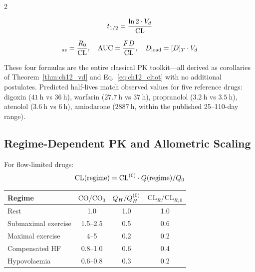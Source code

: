 \begin{multicols}{2}
\begin{corollary}
\begin{equation}
t_{1/2} = \frac{\ln 2\cdot V_d}{\mathrm{CL}}
\label{eq:ch12_thalf}
\end{equation}
\end{corollary}

\begin{corollary}
\begin{equation}
[D]_{ss} = \frac{R_0}{\CLtot}, \quad \mathrm{AUC} = \frac{FD}{\CLtot}, \quad D_{\mathrm{load}} = [D]_T\cdot\Vd
\label{eq:ch12_ss}
\end{equation}
\end{corollary}

These four formulas are the entire classical PK toolkit---all derived as corollaries of Theorem~\ref{thm:ch12_vd} and Eq.~\ref{eq:ch12_cltot} with no additional postulates. Predicted half-lives match observed values for five reference drugs: digoxin ($41\ \mathrm{h}$ vs $36\ \mathrm{h}$), warfarin ($27.7\ \mathrm{h}$ vs $37\ \mathrm{h}$), propranolol ($3.2\ \mathrm{h}$ vs $3.5\ \mathrm{h}$), atenolol ($3.6\ \mathrm{h}$ vs $6\ \mathrm{h}$), amiodarone ($2887\ \mathrm{h}$, within the published 25--110-day range).

\subsection{Regime-Dependent PK and Allometric Scaling}

\begin{theorem}
For flow-limited drugs:
\begin{equation}
\mathrm{CL}(\mathrm{regime}) = \mathrm{CL}^{(0)}\cdot Q(\mathrm{regime})/Q_0
\label{eq:ch12_regime_cl}
\end{equation}
\end{theorem}

\begin{center}
\begin{tabular}{lccc}
\toprule
Regime & $\mathrm{CO}/\mathrm{CO}_0$ & $Q_H/Q_H^{(0)}$ & $\mathrm{CL}_R/\mathrm{CL}_{R,0}$ \\
\midrule
Rest                & 1.0 & 1.0 & 1.0 \\
Submaximal exercise & 1.5--2.5 & 0.5 & 0.6 \\
Maximal exercise    & 4--5     & 0.2 & 0.2 \\
Compensated HF      & 0.8--1.0 & 0.6 & 0.4 \\
Hypovolaemia        & 0.6--0.8 & 0.3 & 0.2 \\
\bottomrule
\end{tabular}
\end{center}


\end{multicols}
